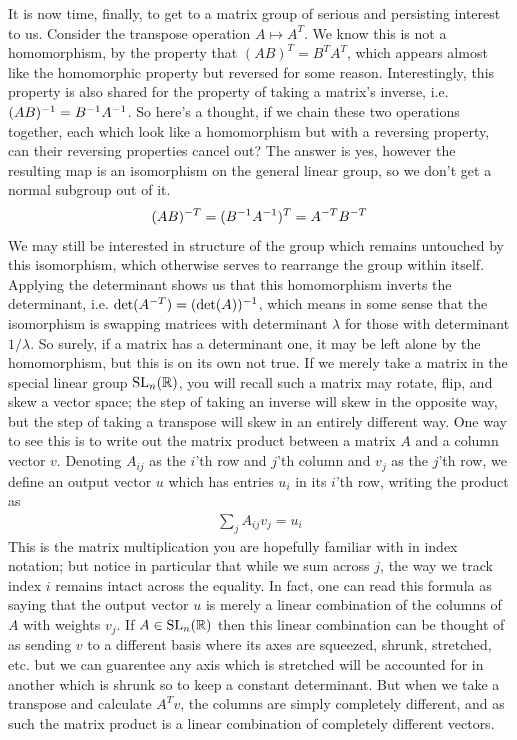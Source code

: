 \documentclass[11pt]{article}
\begin{document}
It is now time, finally, to get to a matrix group of serious and persisting interest to us. Consider the transpose operation $A \mapsto A^T$. We know this is not a homomorphism, by the property that $(AB)^T = B^T A^T$, which appears almost like the homomorphic property but reversed for some reason. Interestingly, this property is also shared for the property of taking a matrix's inverse, i.e. $(AB)^{-1} = B^{-1} A^{-1}$. So here's a thought, if we chain these two operations together, each which look like a homomorphism but with a reversing property, can their reversing properties cancel out? The answer is yes, however the resulting map is an isomorphism on the general linear group, so we don't get a normal subgroup out of it. \begin{gather*}
(AB)^{-T} = (B^{-1} A^{-1})^T = A^{-T} B^{-T}
\end{gather*}
We may still be interested in structure of the group which remains untouched by this isomorphism, which otherwise serves to rearrange the group within itself. Applying the determinant shows us that this homomorphism inverts the determinant, i.e. $\det(A^{-T}) = (\det(A))^{-1}$, which means in some sense that the isomorphism is swapping matrices with determinant $\lambda$ for those with determinant $1/\lambda$. So surely, if a matrix has a determinant one, it may be left alone by the homomorphism, but this is on its own not true. If we merely take a matrix in the special linear group $\mathrm{SL}_n(\mathbb{R})$, you will recall such a matrix may rotate, flip, and skew a vector space; the step of taking an inverse will skew in the opposite way, but the step of taking a transpose will skew in an entirely different way. One way to see this is to write out the matrix product between a matrix $A$ and a column vector $v$. Denoting $A_{ij}$ as the $i$'th row and $j$'th column and $v_j$ as the $j$'th row, we define an output vector $u$ which has entries $u_i$ in its $i$'th row, writing the product as \begin{gather*}
\sum_{j} A_{ij} v_j = u_i
\end{gather*}
This is the matrix multiplication you are hopefully familiar with in index notation; but notice in particular that while we sum across $j$, the way we track index $i$ remains intact across the equality. In fact, one can read this formula as saying that the output vector $u$ is merely a linear combination of the columns of $A$ with weights $v_j$. If $A \in \mathrm{SL}_n(\mathbb{R})$ then this linear combination can be thought of as sending $v$ to a different basis where its axes are squeezed, shrunk, stretched, etc. but we can guarentee any axis which is stretched will be accounted for in another which is shrunk so to keep a constant determinant. But when we take a transpose and calculate $A^T v$, the columns are simply completely different, and as such the matrix product is a linear combination of completely different vectors.
\end{document}
